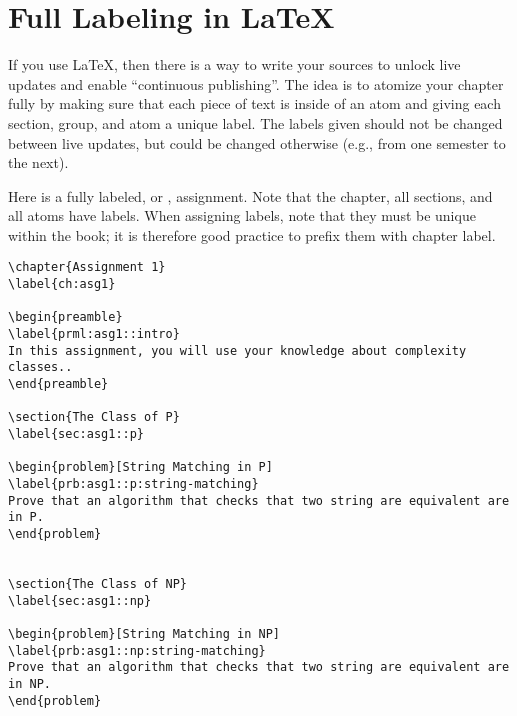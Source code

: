 \section{Full Labeling in LaTeX}
\label{sec:publish::full-labeling}

\begin{gram}
If you use LaTeX, then there is a way to write your sources to unlock live updates and enable ``continuous publishing''.
%
The idea is to atomize your chapter fully by making sure that each piece of text is inside of an atom and giving each section, group, and atom a unique label.
%
The labels given should not be changed between live updates, but could be changed otherwise (e.g., from one semester to the next).
%
\end{gram}


\begin{example}

Here is a fully labeled, or , assignment.  Note that the chapter, all sections, and all atoms have labels.  When assigning labels, note that they must be unique within the book; it is therefore good practice to prefix them with chapter label.
%

\begin{lstlisting}
\chapter{Assignment 1}
\label{ch:asg1}

\begin{preamble}
\label{prml:asg1::intro}
In this assignment, you will use your knowledge about complexity classes..
\end{preamble}

\section{The Class of P}
\label{sec:asg1::p}

\begin{problem}[String Matching in P]
\label{prb:asg1::p:string-matching}
Prove that an algorithm that checks that two string are equivalent are in P.
\end{problem}


\section{The Class of NP}
\label{sec:asg1::np}

\begin{problem}[String Matching in NP]
\label{prb:asg1::np:string-matching}
Prove that an algorithm that checks that two string are equivalent are in NP.
\end{problem}



\end{lstlisting}
\end{example}
